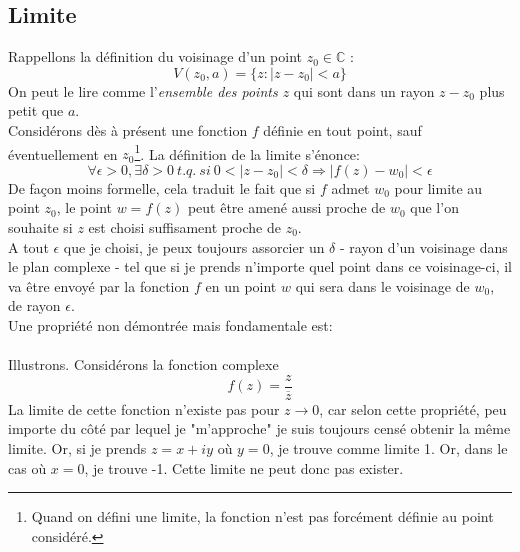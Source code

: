    
    \subsection{Limite}
    Rappellons la définition du voisinage d'un point $z_0\in\mathbb{C}$ :
    \begin{equation}
        V(z_0,a) = \{z : |z-z_0| < a\}
    \end{equation}
    On peut le lire comme l'\textit{ensemble des points $z$} qui sont dans un rayon $z-z_0$
    plus petit que $a$.\\
    
    Considérons dès à présent une fonction $f$ définie en tout point, sauf éventuellement en 
    $z_0$\footnote{Quand on défini une limite, la fonction n'est pas forcément définie au point
    considéré.}. La définition de la limite s'énonce:
    \begin{equation}
    \forall \epsilon > 0, \exists \delta >0\ t.q.\ si\ 0 < |z-z_0| < \delta \Rightarrow |f(z)-w_0|
    < \epsilon
    \end{equation}
    De façon moins formelle, cela traduit le fait que si $f$ admet $w_0$ pour limite au point $z_0$,
    le point $w=f(z)$ peut être amené aussi proche de $w_0$ que l'on souhaite si $z$ est choisi 
    suffisament proche de $z_0$.\\
    A tout $\epsilon$ que je choisi, je peux toujours assorcier un $\delta$ - rayon d'un voisinage 
    dans le plan complexe - tel que si je prends n'importe quel point dans ce voisinage-ci, il va 
    être envoyé par la fonction $f$ en un point $w$ qui sera dans le voisinage de $w_0$, de rayon
    $\epsilon$.\\
    Une propriété non démontrée mais fondamentale est:\\
    
    \ \\
    Illustrons. Considérons la fonction complexe 
    \begin{equation}
    f(z) = \frac{z}{\overline{z}}
    \end{equation}
    La limite de cette fonction n'existe pas pour $z \rightarrow 0$, car selon cette propriété, peu
    importe du côté par lequel je "m'approche" je suis toujours censé obtenir la même limite. Or, si
    je prends $z = x+iy$ où $y=0$, je trouve comme limite 1. Or, dans le cas où $x=0$, je trouve -1.
    Cette limite ne peut donc pas exister.\\
    
